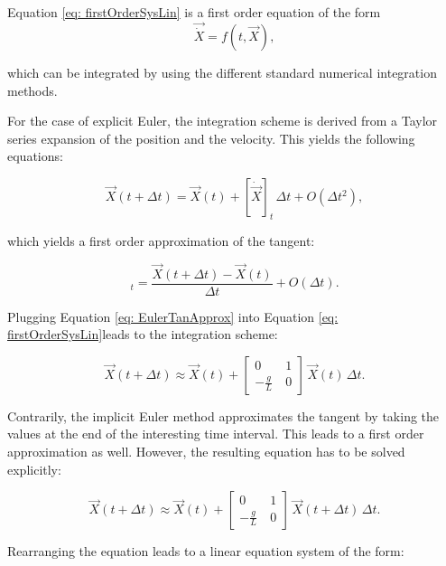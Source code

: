 \documentclass[12pt,bibstyle=none,pagenumberinfooter]{ifmdocument}
\begin{document}
Equation \ref{eq: firstOrderSysLin} is a first order equation of the form
\begin{equation}
    \Vec{\Dot{X}} = f(t,\Vec{X}),
    \label{eq: GeneralIntForm}
\end{equation}

which can be integrated by using the different standard numerical integration methods.

For the case of explicit Euler, the integration scheme is derived from a Taylor series expansion of the position and the velocity. This yields the following equations:

\begin{equation}
    \Vec{X}(t+\Delta t) = \Vec{X}(t) + [\Dot{\Vec{X}}]_t\,\Delta t + {O(\Delta t^2)},
\end{equation}

which yields a first order approximation of the tangent:

\begin{equation}
    [\Vec{\Dot{X}}]_t = \frac{\Vec{X}(t+\Delta t)-\Vec{X}(t)}{\Delta t} + O\left(\Delta t\right).
    \label{eq: EulerTanApprox}
\end{equation}

Plugging Equation \ref{eq: EulerTanApprox} into Equation \ref{eq: firstOrderSysLin}leads to the integration scheme:

\begin{equation}
    \Vec{X}(t+\Delta t) \approx \Vec{X}(t) + \begin{bmatrix}
        0 & 1 \\ -\frac{g}{L}\ & 0
    \end{bmatrix} \, \Vec{X}(t) \, \Delta t.
\end{equation}

Contrarily, the implicit Euler method approximates the tangent by taking the values at the end of the interesting time interval. This leads to a first order approximation as well. However, the resulting equation has to be solved explicitly:

\begin{equation}
    \Vec{X}(t+\Delta t) \approx \Vec{X}(t) + \begin{bmatrix}
        0 & 1 \\ -\frac{g}{L}\ & 0
    \end{bmatrix} \, \Vec{X}(t+\Delta t) \, \Delta t.
\end{equation}

Rearranging the equation leads to a linear equation system of the form:
\end{document}
